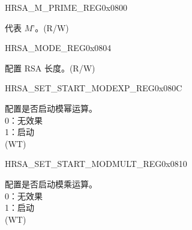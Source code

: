 \begin{register}{H}{RSA\_M\_PRIME\_REG}{0x0800}\label{regdesc:RSAMPRIMEREG}
%
\regnewline%
\begin{regdesc}\begin{reglist}
\label{fielddesc:RSAMPRIME}\item [RSA\_M\_PRIME] 代表 $M’$。(R/W)
\end{reglist}\end{regdesc}
\end{register}


\begin{register}{H}{RSA\_MODE\_REG}{0x0804}\label{regdesc:RSAMODEREG}
%
%
\regnewline%
\begin{regdesc}\begin{reglist}
\label{fielddesc:RSAMODE}\item [RSA\_MODE] 配置 RSA 长度。(R/W)
\end{reglist}\end{regdesc}
\end{register}


\begin{register}{H}{RSA\_SET\_START\_MODEXP\_REG}{0x080C}\label{regdesc:RSASETSTARTMODEXPREG}
%
%
\regnewline%
\begin{regdesc}\begin{reglist}
\label{fielddesc:RSASETSTARTMODEXP}\item [RSA\_SET\_START\_MODEXP] 配置是否启动模幂运算。\\
0：无效果\\
1：启动\\
 (WT)
\end{reglist}\end{regdesc}
\end{register}


\begin{register}{H}{RSA\_SET\_START\_MODMULT\_REG}{0x0810}\label{regdesc:RSASETSTARTMODMULTREG}
%
%
\regnewline%
\begin{regdesc}\begin{reglist}
\label{fielddesc:RSASETSTARTMODMULT}\item [RSA\_SET\_START\_MODMULT] 配置是否启动模乘运算。\\
0：无效果\\
1：启动\\
 (WT)
\end{reglist}\end{regdesc}
\end{register}


